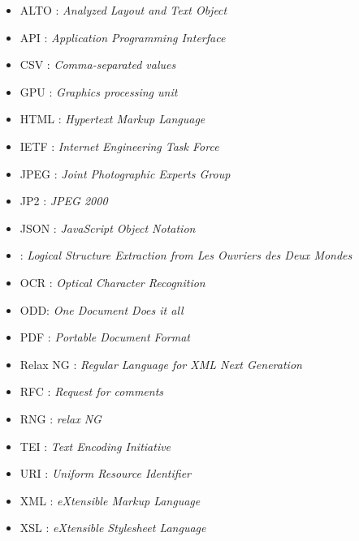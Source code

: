 \begin{itemize}
    \item ALTO : \textit{Analyzed Layout and Text Object}
    \item API : \textit{Application Programming Interface}
    \item CSV : \textit{Comma-separated values}
    \item GPU : \textit{Graphics processing unit}
    \item HTML : \textit{Hypertext Markup Language}
    \item IETF : \textit{Internet Engineering Task Force}
    \item JPEG : \textit{Joint Photographic Experts Group}
    \item JP2 : \textit{JPEG 2000}
    \item JSON : \textit{JavaScript Object Notation}
    \item \lse{} : \textit{Logical Structure Extraction from Les Ouvriers des Deux Mondes}
    \item OCR : \textit{Optical Character Recognition}
    \item ODD: \textit{One Document Does it all}
    \item PDF : \textit{Portable Document Format}
    \item Relax NG : \textit{Regular Language for XML Next Generation}
    \item RFC : \textit{Request for comments}
    \item RNG : \cf{} \textit{relax NG}
    \item TEI : \textit{Text Encoding Initiative}
    \item URI : \textit{Uniform Resource Identifier}
    \item XML : \textit{eXtensible Markup Language}
    \item XSL : \textit{eXtensible Stylesheet Language}
\end{itemize}

\clearpage
\thispagestyle{empty}